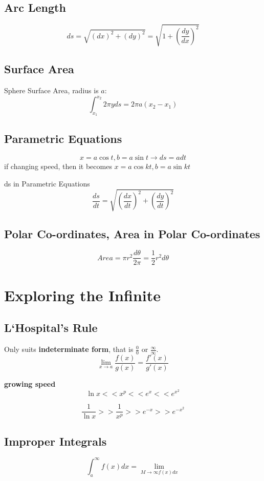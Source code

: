 \documentclass{article}
\newcommand\limitx[1]{\lim_{x \to #1}}
\begin{document}
\subsection{Arc Length}

$$ds = \sqrt{(dx)^2 + (dy)^2} = \sqrt{1 + (\frac{dy}{dx})^2}$$

\subsection{Surface Area}

Sphere Surface Area, radius is $a$:
$$\int_{x_1}^{x_2} 2\pi yds = 2\pi a(x_2-x_1)$$

\subsection{Parametric Equations}

$$ x = a\cos t, b = a\sin t \rightarrow ds = adt$$
if changing speed, then it becomes $x = a\cos kt, b = a\sin kt$

ds in Parametric Equations
$$\frac{ds}{dt} = \sqrt{(\frac{dx}{dt})^2 + (\frac{dy}{dt})^2}$$

\subsection{Polar Co-ordinates, Area in Polar Co-ordinates}

$$$$
$$Area = \pi r^2\frac{d\theta}{2\pi} = \frac{1}{2}r^2d\theta$$

\section{Exploring the Infinite}
\subsection{L‘Hospital's Rule}
Only suits \textbf{indeterminate form}, that is $\frac{0}{0}$ or $\frac{\infty}{\infty}$.
$$\limitx{a} \frac{f(x)}{g(x)} = \frac{f'(x)}{g'(x)}$$

\textbf{growing speed}
$$\ln x << x^p << e^x << e^{x^2}$$

$$\frac{1}{\ln x} >> \frac{1}{x^p} >> e^{-x} >> e^{-x^2}$$

\subsection{Improper Integrals}
$$\int_a^\infty f(x)dx = \lim_{M \rightarrow \infty f(x)dx}$$
\end{document}
